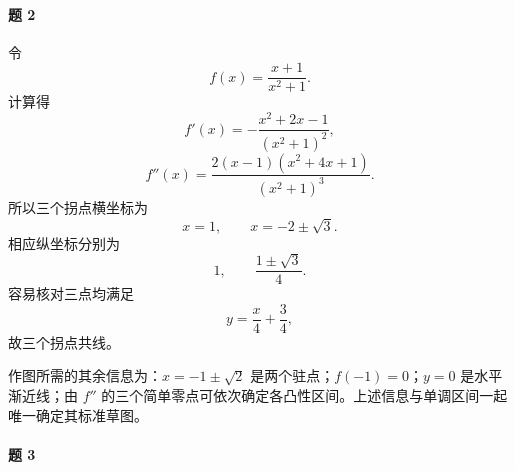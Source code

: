 \paragraph{题 2}
\begin{xsolution}
令
\[
  f(x)=\frac{x+1}{x^2+1}.
\]
计算得
\[
  f'(x)=-\frac{x^2+2x-1}{(x^2+1)^2},
\]
\[
  f''(x)=\frac{2(x-1)(x^2+4x+1)}{(x^2+1)^3}.
\]
所以三个拐点横坐标为
\[
  x=1,\qquad x=-2\pm\sqrt3.
\]
相应纵坐标分别为
\[
  1,\qquad \frac{1\pm\sqrt3}{4}.
\]
容易核对三点均满足
\[
  \boxed{y=\frac x4+\frac34},
\]
故三个拐点共线。

作图所需的其余信息为：$x=-1\pm\sqrt2$ 是两个驻点；$f(-1)=0$；$y=0$ 是水平渐近线；由 $f''$ 的三个简单零点可依次确定各凸性区间。上述信息与单调区间一起唯一确定其标准草图。
\end{xsolution}

\paragraph{题 3}
